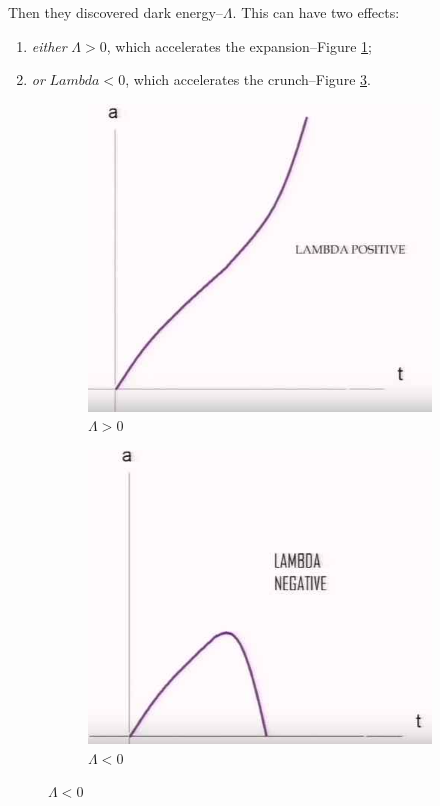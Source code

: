 \documentclass[]{article}
\begin{document}
Then they discovered dark energy--$\Lambda$. This can have two effects:
\begin{enumerate}
	\item \emph{either} $\Lambda>0$, which accelerates the expansion--Figure \ref{fig:wt1ws-lambda-plus};
	\item \emph{or} $Lambda<0$, which accelerates the crunch--Figure \ref{fig:wt1ws-lambda-minus}.
\end{enumerate}

\begin{figure}[H]
	\caption{Effect of $\Lambda$, the Cosmological Constant}
	\begin{subfigure}[t]{0.45\textwidth}
		\caption{ $\Lambda>0$}\label{fig:wt1ws-lambda-plus}
		\includegraphics[width=\textwidth]{wt1ws-lambda-plus}
	\end{subfigure}
	\begin{subfigure}[t]{0.45\textwidth}
		\caption{ $\Lambda<0$}\label{fig:wt1ws-lambda-minus}
		\includegraphics[width=\textwidth]{wt1ws-lambda-minus}
	\end{subfigure}
\end{figure}
\end{document}
